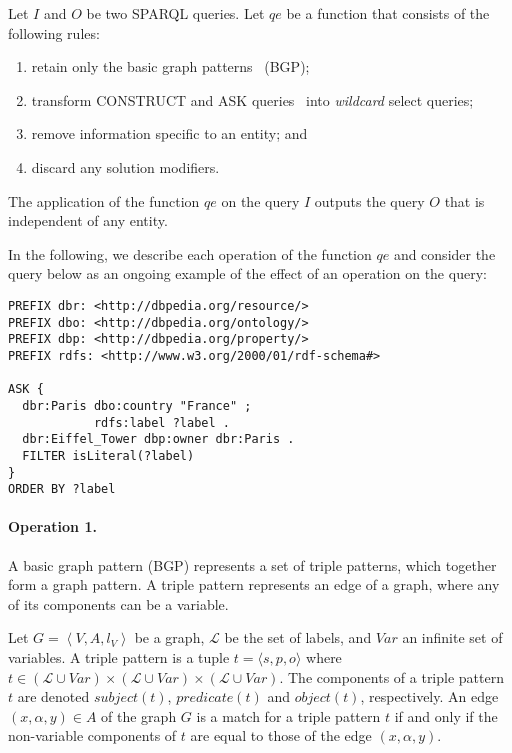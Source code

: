 \begin{definition}
Let $I$ and $O$ be two SPARQL queries. Let $qe$ be a function that consists of the following rules:
\begin{enumerate}
	\item retain only the basic graph patterns~\cite{PrudS08} (BGP);
	\item transform CONSTRUCT and ASK queries~\cite{PrudS08} into \emph{wildcard} select queries;
	\item remove information specific to an entity; and
	\item discard any solution modifiers.
\end{enumerate}
The application of the function $qe$ on the query $I$ outputs the query $O$ that is independent of any entity.
\label{chap6:ranking:def:query-extraction-function}
\end{definition}

In the following, we describe each operation of the function $qe$ and consider the query below as an ongoing example of the effect of an operation on the query:

\begin{verbatim}
PREFIX dbr: <http://dbpedia.org/resource/>
PREFIX dbo: <http://dbpedia.org/ontology/>
PREFIX dbp: <http://dbpedia.org/property/>
PREFIX rdfs: <http://www.w3.org/2000/01/rdf-schema#>

ASK {
  dbr:Paris dbo:country "France" ;
            rdfs:label ?label .
  dbr:Eiffel_Tower dbp:owner dbr:Paris .
  FILTER isLiteral(?label)
}
ORDER BY ?label
\end{verbatim}

\paragraph{Operation 1.}

A basic graph pattern (BGP) represents a set of triple patterns, which together form a graph pattern. A triple pattern represents an edge of a graph, where any of its components can be a variable.
\begin{definition}
Let $G=\left\langle V, A, l_V \right\rangle$ be a graph, $\mathcal{L}$ be the set of labels, and $Var$ an infinite set of variables.
A triple pattern is a tuple $t= \langle s, p, o \rangle$ where $t \in (\mathcal{L} \cup Var) \times (\mathcal{L} \cup Var) \times (\mathcal{L} \cup Var)$.
The components of a triple pattern $t$ are denoted $subject(t)$, $predicate(t)$ and $object(t)$, respectively.
An edge $(x,\alpha,y) \in A$ of the graph $G$ is a match for a triple pattern $t$ if and only if the non-variable components of $t$ are equal to those of the edge $(x, \alpha, y)$.
\label{chap6:ranking:def:triple-pattern}
\end{definition}


